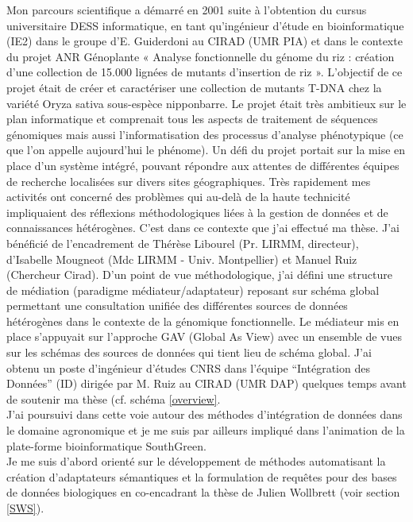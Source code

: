 Mon parcours scientifique a démarré en 2001 suite à l'obtention du cursus universitaire DESS informatique, en tant qu’ingénieur d’étude en bioinformatique (IE2) dans le groupe d’E. Guiderdoni au CIRAD (UMR PIA) et dans le contexte du projet ANR Génoplante « Analyse fonctionnelle du génome du riz : création d'une collection de 15.000 lignées de mutants d'insertion de riz ».  L'objectif de ce projet était de créer et caractériser une collection de mutants T-DNA chez la variété Oryza sativa sous-espèce nipponbarre. Le projet était très ambitieux sur le plan informatique et comprenait tous les aspects de traitement de séquences génomiques mais aussi l’informatisation des processus d’analyse phénotypique (ce que l’on appelle aujourd’hui le phénome). Un défi du projet portait sur la mise en place d’un système intégré, pouvant répondre aux attentes de différentes  équipes de recherche localisées sur divers sites géographiques. Très rapidement mes activités ont concerné des problèmes qui au-delà de la haute technicité impliquaient des réflexions méthodologiques liées à la gestion de données et de connaissances hétérogènes. C’est dans ce contexte que j’ai effectué ma thèse. J’ai bénéficié de l’encadrement  de Thérèse Libourel (Pr. LIRMM, directeur), d’Isabelle Mougneot (Mdc LIRMM - Univ. Montpellier) et Manuel Ruiz (Chercheur Cirad). D’un point de vue méthodologique, j’ai défini une structure de médiation (paradigme médiateur/adaptateur) reposant sur schéma global permettant  une consultation unifiée des différentes sources de données hétérogènes dans le contexte de la génomique fonctionnelle. Le médiateur mis en place s’appuyait sur l’approche GAV (Global As View) avec un ensemble de vues sur les schémas des sources de données qui tient lieu de schéma global. J’ai obtenu un poste d’ingénieur d’études CNRS dans l’équipe “Intégration des Données” (ID) dirigée par M. Ruiz au CIRAD (UMR DAP) quelques temps avant de soutenir ma thèse (cf. schéma \ref{overview}. \\

J’ai poursuivi dans cette voie autour des méthodes d’intégration de données dans le domaine agronomique et je me suis par ailleurs impliqué dans l’animation de la plate-forme bioinformatique SouthGreen.  \\
Je me suis d’abord orienté sur le développement de méthodes automatisant la création d’adaptateurs sémantiques et la formulation de requêtes pour des bases de données biologiques en co-encadrant la thèse de Julien Wollbrett (voir section \ref{SWS}).\\

